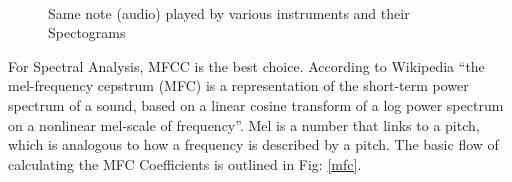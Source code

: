 \documentclass[conference]{IEEEtran}
\begin{document}
\begin{figure}[h!]
	\centering
	\\
	\caption{Same note (audio) played by various instruments and their Spectograms}
	\label{fig:instr}
\end{figure}

For Spectral Analysis, MFCC \cite{logan2000mel} is the best choice. According to Wikipedia\cite{wiki:00} ``the mel-frequency cepstrum (MFC) is a representation of the short-term power spectrum of a sound, based on a linear cosine transform of a log power spectrum on a nonlinear mel-scale of frequency''. Mel is a number that links to a pitch, which is analogous to how a frequency is described by a pitch. The basic flow of calculating the MFC Coefficients is outlined in Fig: \ref{mfc}.
\\
\end{document}
